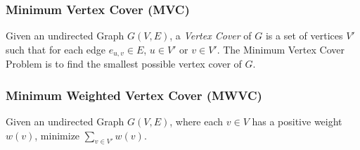 \subsubsection{Minimum Vertex Cover (MVC)}
\label{sub:mvc}
Given an undirected Graph $G(V,E)$, a {\em Vertex Cover} of $G$ is a set of vertices $V'$ such that for each edge $e_{u,v} \in E$, $u \in V'$ or $v \in V'$. The Minimum Vertex Cover Problem is to find the smallest possible vertex cover of $G$.

\subsubsection{Minimum Weighted Vertex Cover (MWVC)}
\label{sub:mwvc}
Given an undirected Graph $G(V,E)$, where each $v \in V$ has a positive weight $w(v)$, minimize $\sum_{v \in V'} w(v)$.


